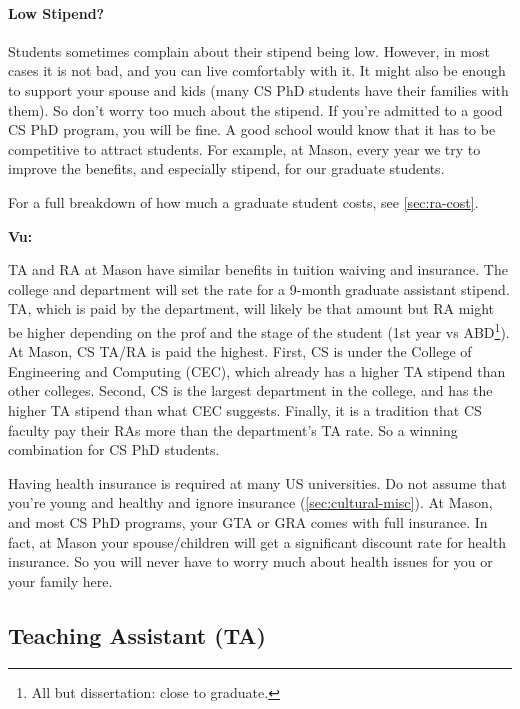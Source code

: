\documentclass[oneside,11pt,dvipsnames]{book}
\newenvironment{commentbox}[1][]{
  \small
  \begin{mybox}
    {\small \textbf{#1}}
  }{
  \end{mybox}
}
\begin{document}
\paragraph{Low Stipend?} Students sometimes complain about their stipend being low. However, in most cases it is not bad, and you can live comfortably with it.  It might also be enough to support your spouse and kids (many CS PhD students have their families with them). So don't worry too much about the stipend.  If you're admitted to a good CS PhD program, you will be fine. A good school would know that it has to be competitive to attract students.  For example, at Mason, every year we try to improve the benefits, and especially stipend, for our graduate students.

For a full breakdown of how much a graduate student costs, see \autoref{sec:ra-cost}.


\begin{commentbox}[Vu:]
  TA and RA at Mason have similar benefits in tuition waiving and insurance.  The college and department will set the rate for a 9-month graduate assistant stipend.  TA, which is paid by the department, will likely be that amount but RA might be higher depending on  the prof and the stage of the student (1st year vs ABD\footnote{All but dissertation: close to graduate.}).\\

  At Mason, CS TA/RA is paid the highest.  First, CS is under the College of Engineering and Computing (CEC), which already has a higher TA stipend than other colleges.  Second, CS is the largest department in the college, and has the higher TA stipend than what CEC suggests.  Finally, it is a tradition that CS faculty pay their RAs more than the department's TA rate.  So a winning combination for CS PhD students.
  
  \tcblower
  Having health insurance is required at many US universities.  Do not assume that you're young and healthy and ignore insurance (\autoref{sec:cultural-misc}).  At Mason, and most CS PhD programs, your GTA or GRA comes with full insurance. In fact, at Mason your spouse/children will get a significant discount rate for health insurance.  So you will never have to worry much about health issues for you or your family here.
\end{commentbox}


\subsection{Teaching Assistant (TA)}\label{sec:ta}
\end{document}
